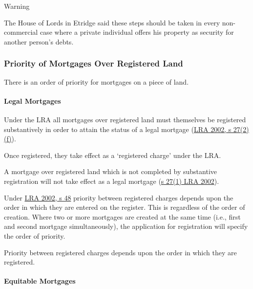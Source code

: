\documentclass[
]{article}
\newenvironment{env-7ede146d-a28c-46fa-985d-64c388b7528b}
{
    \savenotes\tcolorbox[blanker,breakable,left=5pt,borderline west={2pt}{-4pt}{orange}]
}
{
    \endtcolorbox\spewnotes
}
\begin{document}
\begin{env-7ede146d-a28c-46fa-985d-64c388b7528b}

Warning

The House of Lords in Etridge said these steps should be taken in every
non-commercial case where a private individual offers his property as
security for another person's debts.

\end{env-7ede146d-a28c-46fa-985d-64c388b7528b}

\hypertarget{priority-of-mortgages-over-registered-land}{%
\subsubsection{Priority of Mortgages Over Registered
Land}\label{priority-of-mortgages-over-registered-land}}

There is an order of priority for mortgages on a piece of land.

\hypertarget{legal-mortgages-1}{%
\paragraph{Legal Mortgages}\label{legal-mortgages-1}}

Under the LRA all mortgages over registered land must themselves be
registered substantively in order to attain the status of a legal
mortgage
(\href{https://www.legislation.gov.uk/ukpga/2002/9/section/27}{LRA 2002,
s 27(2)(f)}).

Once registered, they take effect as a `registered charge' under the
LRA.

A mortgage over registered land which is not completed by substantive
registration will not take effect as a legal mortgage
(\href{https://www.legislation.gov.uk/ukpga/2002/9/section/27}{s 27(1)
LRA 2002}).

Under \href{https://www.legislation.gov.uk/ukpga/2002/9/section/48}{LRA
2002, s 48} priority between registered charges depends upon the order
in which they are entered on the register. This is regardless of the
order of creation. Where two or more mortgages are created at the same
time (i.e., first and second mortgage simultaneously), the application
for registration will specify the order of priority.

Priority between registered charges depends upon the order in which they
are registered.

\hypertarget{equitable-mortgages-1}{%
\paragraph{Equitable Mortgages}\label{equitable-mortgages-1}}
\end{document}
